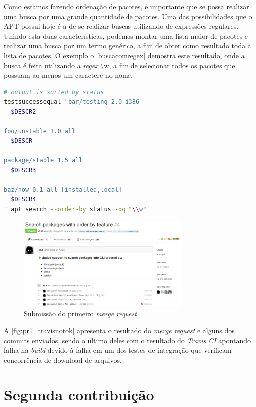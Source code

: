 Como estamos fazendo ordenação de pacotes, é importante que se possa realizar uma busca por uma grande quantidade de pacotes. Uma das possibilidades que o APT possui hoje é a de se realizar buscas utilizando de expressões regulares. Unindo esta duas características, podemos montar uma lista maior de pacotes e realizar uma busca por um termo genérico, a fim de obter como resultado toda a lista de pacotes. O exemplo o \autoref{buscacomregex} demostra este resultado, onde a busca é feita utilizando a \textit{regex} {\code \textbackslash w}, a fim de selecionar todos os pacotes que possuam ao menos um caractere no nome.

\begin{lstlisting}[language=Bash,label=buscacomregex,caption={Busca com uso de expressão regular}]
# output is sorted by status
testsuccessequal "bar/testing 2.0 i386
  $DESCR2

foo/unstable 1.0 all
  $DESCR

package/stable 1.5 all
  $DESCR3

baz/now 0.1 all [installed,local]
  $DESCR4
" apt search --order-by status -qq "\\w"
\end{lstlisting}

\begin{figure}[h]
  \centering
	\includegraphics[width=0.75\textwidth]{figuras/pr1}
  \caption{Submissão do primeiro \textit{merge request}}
  \label{fig:pr1_travisnotok}
\end{figure}

A \autoref{fig:pr1_travisnotok} apresenta o resultado do \textit{merge request} e alguns dos commits enviados, sendo o ultimo deles com o resultado do \textit{Travis CI} apontando falha na \textit{build} devido à falha em um dos testes de integração que verificam concorrência de download de arquivos.



\section{Segunda contribuição} %
\label{sec:segunda_contribui_o}

